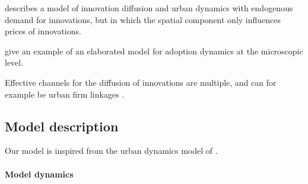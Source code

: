 \documentclass[letterpaper]{article}
\begin{document}
\cite{d2014urban}

\cite{batty2009digital}

\cite{blommestein1987adoption} describes a model of innovation diffusion and urban dynamics with endogenous demand for innovations, but in which the spatial component only influences prices of innovations.

\cite{deffuant2005individual} give an example of an elaborated model for adoption dynamics at the microscopic level.

Effective channels for the diffusion of innovations are multiple, and can for example be urban firm linkages \citep{rozenblat2007firm}.


\subsection{Model description}




Our model is inspired from the urban dynamics model of \cite{favaro2011gibrat}.

\paragraph{Model dynamics}

\end{document}
